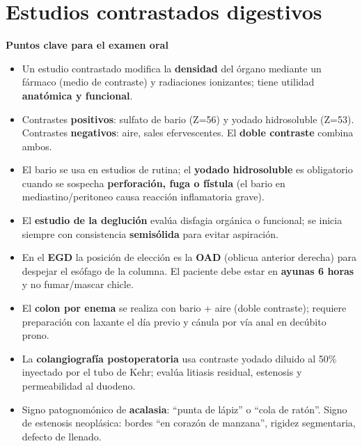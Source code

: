 
\chapter{Estudios contrastados digestivos}



\begin{cajakeypoints}
	\textbf{\color{azulprincipal} Puntos clave para el examen oral}
	\begin{itemize}[noitemsep, topsep=2pt]
		\item Un estudio contrastado modifica la \textbf{densidad} del órgano mediante un fármaco (medio de contraste) y radiaciones ionizantes; tiene utilidad \textbf{anatómica y funcional}.
		\item Contrastes \textbf{positivos}: sulfato de bario (Z=56) y yodado hidrosoluble (Z=53). Contrastes \textbf{negativos}: aire, sales efervescentes. El \textbf{doble contraste} combina ambos.
		\item El bario se usa en estudios de rutina; el \textbf{yodado hidrosoluble} es obligatorio cuando se sospecha \textbf{perforación, fuga o fístula} (el bario en mediastino/peritoneo causa reacción inflamatoria grave).
		\item El \textbf{estudio de la deglución} evalúa disfagia orgánica o funcional; se inicia siempre con consistencia \textbf{semisólida} para evitar aspiración.
		\item En el \textbf{EGD} la posición de elección es la \textbf{OAD} (oblicua anterior derecha) para despejar el esófago de la columna. El paciente debe estar en \textbf{ayunas 6 horas} y no fumar/mascar chicle.
		\item El \textbf{colon por enema} se realiza con bario + aire (doble contraste); requiere preparación con laxante el día previo y cánula por vía anal en decúbito prono.
		\item La \textbf{colangiografía postoperatoria} usa contraste yodado diluido al 50\% inyectado por el tubo de Kehr; evalúa litiasis residual, estenosis y permeabilidad al duodeno.
		\item Signo patognomónico de \textbf{acalasia}: ``punta de lápiz'' o ``cola de ratón''. Signo de estenosis neoplásica: bordes ``en corazón de manzana'', rigidez segmentaria, defecto de llenado.
	\end{itemize}
\end{cajakeypoints}

